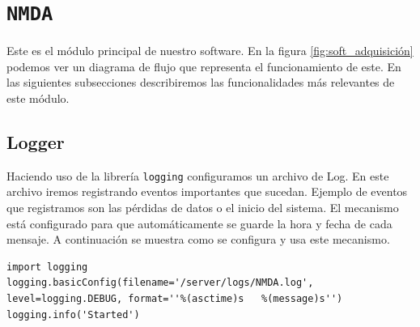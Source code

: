\section{\texttt{NMDA}}
	Este es el módulo principal de nuestro software. En la figura \ref{fig:soft_adquisición} podemos ver un diagrama de flujo que representa el
	funcionamiento de este. En las siguientes subsecciones describiremos las funcionalidades más relevantes de este módulo.
	\subsection{Logger}
		Haciendo uso de la librería \texttt{logging}\cite{py_logging} configuramos un archivo de Log. En este archivo iremos registrando eventos importantes
		que sucedan. Ejemplo de eventos que registramos son las pérdidas de datos o el inicio del sistema. El mecanismo está configurado para
		que automáticamente se guarde la hora y fecha de cada mensaje. A continuación se muestra como se configura y usa este mecanismo.
		\begin{lstlisting}
import logging
logging.basicConfig(filename='/server/logs/NMDA.log', level=logging.DEBUG, format=''%(asctime)s   %(message)s'')
logging.info('Started')
		\end{lstlisting}
